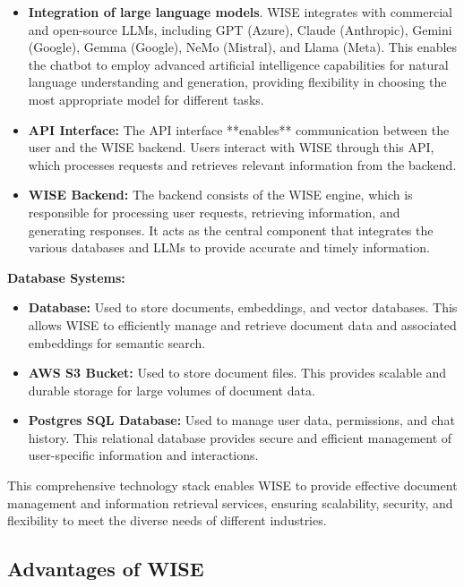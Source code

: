 \begin{itemize}
    \item \textbf{Integration of large language models}. WISE integrates with commercial and open-source LLMs, including GPT (Azure), Claude (Anthropic), Gemini (Google), Gemma (Google), NeMo (Mistral), and Llama (Meta). This enables the chatbot to employ advanced artificial intelligence capabilities for natural language understanding and generation, providing flexibility in choosing the most appropriate model for different tasks.

    \item \textbf{API Interface:} The API interface **enables** communication between the user and the WISE backend. Users interact with WISE through this API, which processes requests and retrieves relevant information from the backend.

    \item \textbf{WISE Backend:} The backend consists of the WISE engine, which is responsible for processing user requests, retrieving information, and generating responses. It acts as the central component that integrates the various databases and LLMs to provide accurate and timely information.
\end{itemize}

\textbf{Database Systems:} 

\begin{itemize}
    \item \textbf{Database: } Used to store documents, embeddings, and vector databases. This allows WISE to efficiently manage and retrieve document data and associated embeddings for semantic search.
    \item \textbf{AWS S3 Bucket:} Used to store document files. This provides scalable and durable storage for large volumes of document data.
    \item \textbf{Postgres SQL Database:} Used to manage user data, permissions, and chat history. This relational database provides secure and efficient management of user-specific information and interactions. \cite{hpa2024}
\end{itemize}

This comprehensive technology stack enables WISE to provide effective document management and information retrieval services, ensuring scalability, security, and flexibility to meet the diverse needs of different industries.

\subsection{Advantages of WISE}

